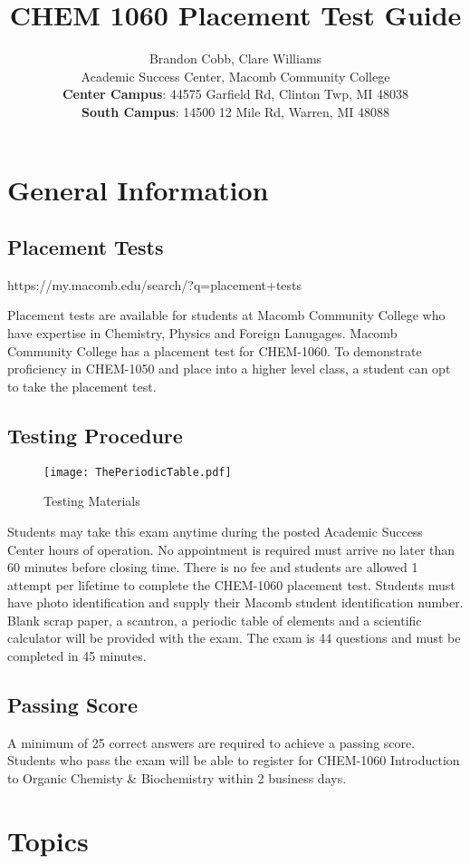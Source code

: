 \documentclass[10pt, roman]{article}
\title{CHEM 1060 Placement Test Guide}
\author{
Brandon Cobb, Clare Williams \\
Academic Success Center, Macomb Community College \\
\textbf{Center Campus}: 44575 Garfield Rd, Clinton Twp, MI 48038 \\
\textbf{South Campus}: 14500 12 Mile Rd, Warren, MI 48088
}
\begin{document}
\maketitle

\tableofcontents

\section{General Information}
\subsection{Placement Tests}
{\centering https://my.macomb.edu/search/?q=placement+tests\par}
Placement tests are available for students at Macomb Community College who have expertise in Chemistry, Physics and Foreign Lanugages.
Macomb Community College has a placement test for CHEM-1060.
To demonstrate proficiency in CHEM-1050 and place into a higher level class, a student can opt to take the placement test.
\newpage
\subsection{Testing Procedure}
\begin{figure}[ht!]
\centering
\texttt{[image: ThePeriodicTable.pdf]}
\caption{Testing Materials}
\label{overflow}
\end{figure}
Students may take this exam anytime during the posted Academic Success Center hours of operation.
No appointment is required must arrive no later than 60 minutes before closing time.
There is no fee and students are allowed 1 attempt per lifetime to complete the CHEM-1060 placement test.
Students must have photo identification and supply their Macomb student identification number.
Blank scrap paper, a scantron, a periodic table of elements and a scientific calculator will be provided with the exam.
The exam is 44 questions and must be completed in 45 minutes.
\subsection{Passing Score}
A minimum of 25 correct answers are required to achieve a passing score.
Students who pass the exam will be able to register for CHEM-1060 Introduction to Organic Chemisty \& Biochemistry within 2 business days.

\section{Topics}
\end{document}
